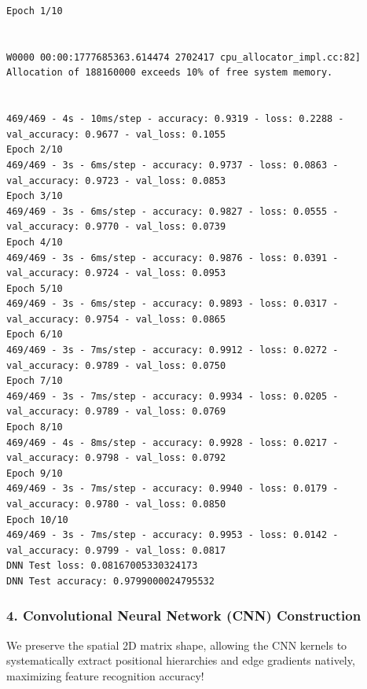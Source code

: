\begin{lstlisting}
Epoch 1/10


W0000 00:00:1777685363.614474 2702417 cpu_allocator_impl.cc:82] Allocation of 188160000 exceeds 10% of free system memory.


469/469 - 4s - 10ms/step - accuracy: 0.9319 - loss: 0.2288 - val_accuracy: 0.9677 - val_loss: 0.1055
Epoch 2/10
469/469 - 3s - 6ms/step - accuracy: 0.9737 - loss: 0.0863 - val_accuracy: 0.9723 - val_loss: 0.0853
Epoch 3/10
469/469 - 3s - 6ms/step - accuracy: 0.9827 - loss: 0.0555 - val_accuracy: 0.9770 - val_loss: 0.0739
Epoch 4/10
469/469 - 3s - 6ms/step - accuracy: 0.9876 - loss: 0.0391 - val_accuracy: 0.9724 - val_loss: 0.0953
Epoch 5/10
469/469 - 3s - 6ms/step - accuracy: 0.9893 - loss: 0.0317 - val_accuracy: 0.9754 - val_loss: 0.0865
Epoch 6/10
469/469 - 3s - 7ms/step - accuracy: 0.9912 - loss: 0.0272 - val_accuracy: 0.9789 - val_loss: 0.0750
Epoch 7/10
469/469 - 3s - 7ms/step - accuracy: 0.9934 - loss: 0.0205 - val_accuracy: 0.9789 - val_loss: 0.0769
Epoch 8/10
469/469 - 4s - 8ms/step - accuracy: 0.9928 - loss: 0.0217 - val_accuracy: 0.9798 - val_loss: 0.0792
Epoch 9/10
469/469 - 3s - 7ms/step - accuracy: 0.9940 - loss: 0.0179 - val_accuracy: 0.9780 - val_loss: 0.0850
Epoch 10/10
469/469 - 3s - 7ms/step - accuracy: 0.9953 - loss: 0.0142 - val_accuracy: 0.9799 - val_loss: 0.0817
DNN Test loss: 0.08167005330324173
DNN Test accuracy: 0.9799000024795532
\end{lstlisting}

\hypertarget{convolutional-neural-network-cnn-construction}{%
\subsubsection{4. Convolutional Neural Network (CNN)
Construction}\label{convolutional-neural-network-cnn-construction}}

We preserve the spatial 2D matrix shape, allowing the CNN kernels to
systematically extract positional hierarchies and edge gradients
natively, maximizing feature recognition accuracy!

